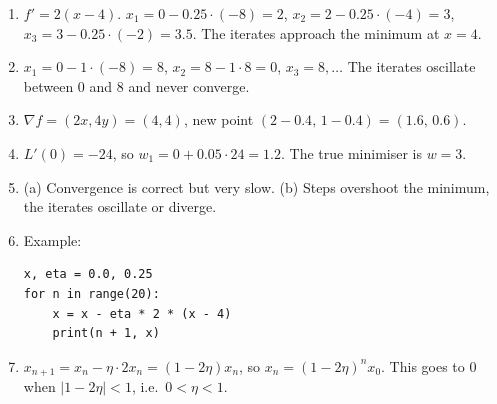 \begin{enumerate}[label=\textbf{\ansnum.\arabic*}]
  \item $f'=2(x-4)$. $x_1=0-0.25\cdot(-8)=2$, $x_2=2-0.25\cdot(-4)=3$, $x_3=3-0.25\cdot(-2)=3.5$. The iterates approach the minimum at $x=4$.
  \item $x_1=0-1\cdot(-8)=8$, $x_2=8-1\cdot 8=0$, $x_3=8,\dots$ The iterates oscillate between $0$ and $8$ and never converge.
  \item $\nabla f=(2x,4y)=(4,4)$, new point $(2-0.4,\,1-0.4)=(1.6,\,0.6)$.
  \item $L'(0)=-24$, so $w_1=0+0.05\cdot 24=1.2$. The true minimiser is $w=3$.
  \item (a) Convergence is correct but very slow. (b) Steps overshoot the minimum, the iterates oscillate or diverge.
  \item[\textbf{\ansnum.6}] Example:
\begin{verbatim}
x, eta = 0.0, 0.25
for n in range(20):
    x = x - eta * 2 * (x - 4)
    print(n + 1, x)
\end{verbatim}
  \item[\textbf{\ansnum.7}] $x_{n+1}=x_n-\eta\cdot 2x_n=(1-2\eta)x_n$, so $x_n=(1-2\eta)^nx_0$. This goes to $0$ when $|1-2\eta|<1$, i.e.\ $0<\eta<1$.
\end{enumerate}
